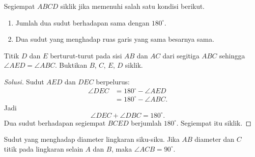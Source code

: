 \documentclass[12pt]{scrartcl}
\begin{document}
\begin{theorem}
Segiempat $ABCD$ siklik jika memenuhi salah satu kondisi berikut.
\begin{enumerate}
    \item Jumlah dua sudut berhadapan sama dengan $180^\circ$.
    \item Dua sudut yang menghadap ruas garis yang sama besarnya sama.
\end{enumerate}
\end{theorem}

\begin{example}
Titik $D$ dan $E$ berturut-turut pada sisi $AB$ dan $AC$ dari segitiga
$ABC$ sehingga $\angle AED = \angle ABC$. Buktikan $B$, $C$, $E$, $D$
siklik.
\begin{center}
\end{center}
\end{example}
\begin{proof}[Solusi]
Sudut $AED$ dan $DEC$ berpelurus:
\begin{align*}
\angle DEC &= 180^\circ - \angle AED \\
&= 180^\circ - \angle ABC.
\end{align*}
Jadi
\[ \angle DEC + \angle DBC = 180^\circ. \]
Dua sudut berhadapan segiempat $BCED$ berjumlah $180^\circ$. Segiempat
itu siklik.
\end{proof}

\begin{fact}[Thales]
Sudut yang menghadap diameter lingkaran siku-siku. Jika $AB$ diameter
dan $C$ titik pada lingkaran selain $A$ dan $B$, maka
$\angle ACB = 90^\circ$.
\end{fact}
\end{document}
